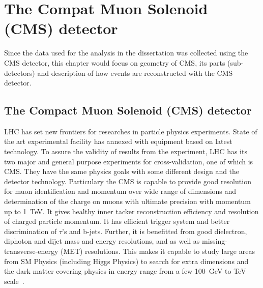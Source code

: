 
\chapter{The Compat Muon Solenoid (CMS) detector} %

\label{Chapter2_CMS} %
Since the data used for the analysis in the dissertation was collected using the CMS detector, this chapter would focus on geometry of CMS, its parts (sub-detectors) and description of how events are reconstructed with the CMS detector.
\section{The Compact Muon Solenoid (CMS) detector}
LHC has set new frontiers for researches in particle physics experiments. State of the art experimental facility has annexed with equipment based on latest technology. To assure the validity of results from the experiment, LHC has its two major and general purpose experiments for cross-validation, one of which is CMS. They have the same physics goals with some different design and the detector technology. Particulary the CMS is capable to provide good resolution for muon identification and momentum over wide range of dimensions and determination of the charge on muons with ultimate precision with momentum up to 1~TeV.
It gives healthy inner tacker reconstruction efficiency and resolution of charged particle momentum. It has efficient trigger system and better discrimination of  $\tau$'s and b-jets. Further, it is benefitted from good dielectron, diphoton and dijet mass and energy resolutions, and as well as missing-transverse-energy (MET) resolutions. 
This makes it capable to study large areas from SM Physics (including Higgs Physics) to search for extra dimensions and the dark matter covering physics in energy range from a few 100~GeV to TeV scale~\cite{Reference34}.
